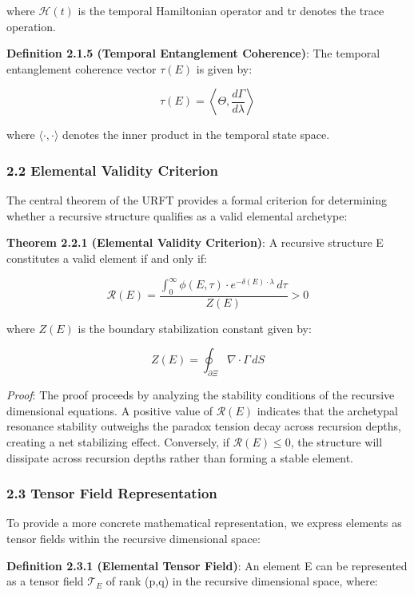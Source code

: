 \documentclass[
]{article}
\begin{document}
where \(\mathcal{H}(t)\) is the temporal Hamiltonian operator and tr
denotes the trace operation.

\textbf{Definition 2.1.5 (Temporal Entanglement Coherence)}: The
temporal entanglement coherence vector \(\tau (E)\) is given by:

\[\tau(E) = \left\langle \Theta, \frac{d\Gamma}{d\lambda} \right\rangle\]

where \(\langle \cdot, \cdot \rangle\) denotes the inner product in the
temporal state space.

\subsubsection{2.2 Elemental Validity
Criterion}\label{elemental-validity-criterion}

The central theorem of the URFT provides a formal criterion for
determining whether a recursive structure qualifies as a valid elemental
archetype:

\textbf{Theorem 2.2.1 (Elemental Validity Criterion)}: A recursive
structure E constitutes a valid element if and only if:

\[\mathcal{R}(E) = \frac{\int_{0}^{\infty} \phi(E, \tau) \cdot e^{-\delta(E) \cdot \lambda} \, d\tau}{Z(E)} > 0\]

where \(Z(E)\) is the boundary stabilization constant given by:

\[Z(E) = \oint_{\partial \Xi} \nabla \cdot \Gamma \, dS\]

\emph{Proof}: The proof proceeds by analyzing the stability conditions
of the recursive dimensional equations. A positive value of
\(\mathcal{R}(E)\) indicates that the archetypal resonance stability
outweighs the paradox tension decay across recursion depths, creating a
net stabilizing effect. Conversely, if \(\mathcal{R}(E) \leq 0\), the
structure will dissipate across recursion depths rather than forming a
stable element.

\subsubsection{2.3 Tensor Field
Representation}\label{tensor-field-representation}

To provide a more concrete mathematical representation, we express
elements as tensor fields within the recursive dimensional space:

\textbf{Definition 2.3.1 (Elemental Tensor Field)}: An element E can be
represented as a tensor field \(\mathcal{T}_E\) of rank (p,q) in the
recursive dimensional space, where:
\end{document}
